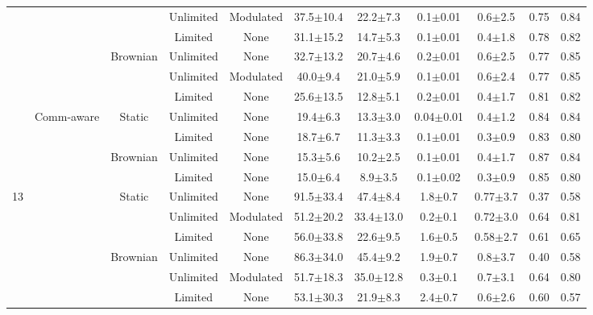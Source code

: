\documentclass[conference]{IEEEtran}
\begin{document}
\begin{table}[ht]
\begin{tabular}{c|c|c|c|c|c|c|c|c|c|c}
  &   &          & Unlimited & Modulated & 37.5$\pm$10.4 & 22.2$\pm$7.3 & 0.1$\pm$0.01 & 0.6$\pm$2.5 & 0.75 & 0.84 \\
  &   &          & Limited   & None      & 31.1$\pm$15.2 & 14.7$\pm$5.3 & 0.1$\pm$0.01 & 0.4$\pm$1.8 & 0.78 & 0.82 \\
  \cmidrule{3-11}
  &   & \multirow{2}{*}{Brownian}
                 & Unlimited & None      & 32.7$\pm$13.2 & 20.7$\pm$4.6 & 0.2$\pm$0.01 & 0.6$\pm$2.5 & 0.77 & 0.85 \\
  &   &          & Unlimited & Modulated & 40.0$\pm$9.4  & 21.0$\pm$5.9 & 0.1$\pm$0.01 & 0.6$\pm$2.4 & 0.77 & 0.85 \\
  &   &          & Limited   & None      & 25.6$\pm$13.5 & 12.8$\pm$5.1 & 0.2$\pm$0.01 & 0.4$\pm$1.7 & 0.81 & 0.82 \\
  \cmidrule{2-11}
  & \multirow{5}{*}{Comm-aware}
    & \multirow{2}{*}{Static}
                 & Unlimited & None      & 19.4$\pm$6.3 & 13.3$\pm$3.0 & 0.04$\pm$0.01 & 0.4$\pm$1.2 & 0.84 & 0.84 \\
  &   &          & Limited   & None      & 18.7$\pm$6.7 & 11.3$\pm$3.3 & 0.1$\pm$0.01 & 0.3$\pm$0.9 & 0.83 & 0.80 \\
  \cmidrule{3-11}
  &   & \multirow{2}{*}{Brownian}
                 & Unlimited & None      & 15.3$\pm$5.6 & 10.2$\pm$2.5 & 0.1$\pm$0.01 & 0.4$\pm$1.7 & 0.87 & 0.84 \\
  &   &          & Limited   & None      & 15.0$\pm$6.4 & 8.9$\pm$3.5 & 0.1$\pm$0.02 & 0.3$\pm$0.9 & 0.85 & 0.80 \\
\midrule
\multirow{10}{*}{13}
  & \multirow{5}{*}{Stochastic}
    & \multirow{2}{*}{Static}
                 & Unlimited & None      & 91.5$\pm$33.4 & 47.4$\pm$8.4 & 1.8$\pm$0.7 & 0.77$\pm$3.7 & 0.37 & 0.58 \\
  &   &          & Unlimited & Modulated & 51.2$\pm$20.2 & 33.4$\pm$13.0 & 0.2$\pm$0.1 & 0.72$\pm$3.0 & 0.64 & 0.81 \\
  &   &          & Limited   & None      & 56.0$\pm$33.8 & 22.6$\pm$9.5 & 1.6$\pm$0.5 & 0.58$\pm$2.7 & 0.61 & 0.65 \\
  \cmidrule{3-11}
  &   & \multirow{2}{*}{Brownian}
                 & Unlimited & None      & 86.3$\pm$34.0 & 45.4$\pm$9.2 & 1.9$\pm$0.7 & 0.8$\pm$3.7 & 0.40 & 0.58 \\
  &   &          & Unlimited & Modulated & 51.7$\pm$18.3 & 35.0$\pm$12.8 & 0.3$\pm$0.1 & 0.7$\pm$3.1 & 0.64 & 0.80 \\
  &   &          & Limited   & None      & 53.1$\pm$30.3 & 21.9$\pm$8.3 & 2.4$\pm$0.7 & 0.6$\pm$2.6 & 0.60 & 0.57 \\

\end{tabular}
\end{table}
\end{document}
